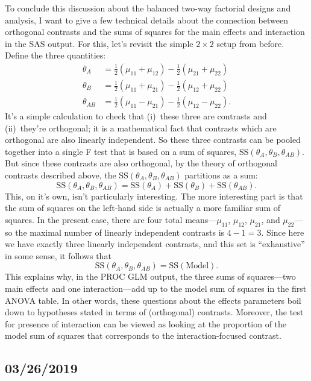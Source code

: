 \documentclass[a4paper, 12pt]{article}
\theoremstyle{plain}
\theoremstyle{definition}
\theoremstyle{remark}
\begin{document}
To conclude this discussion about the balanced two-way factorial designs and analysis, I want to give a few technical details about the connection between orthogonal contrasts and the sums of squares for the main effects and interaction in the SAS output.  For this, let's revisit the simple $2 \times 2$ setup from before.  Define the three quantities:
\begin{align*}
\theta_A & = \tfrac12(\mu_{11} + \mu_{12}) - \tfrac12(\mu_{21} + \mu_{22}) \\
\theta_B & = \tfrac12(\mu_{11} + \mu_{21}) - \tfrac12(\mu_{12} + \mu_{22}) \\
\theta_{AB} & = \tfrac12 (\mu_{11} - \mu_{21}) - \tfrac12 (\mu_{12} - \mu_{22}).
\end{align*}
It's a simple calculation to check that (i)~these three are contrasts and (ii)~they're orthogonal; it is a mathematical fact that contrasts which are orthogonal are also linearly independent.  So these three contrasts can be pooled together into a single F test that is based on a sum of squares, $\text{SS}(\theta_A, \theta_B, \theta_{AB})$.  But since these contrasts are also orthogonal, by the theory of orthogonal contrasts described above, the $\text{SS}(\theta_A, \theta_B, \theta_{AB})$ partitions as a sum:
\[ \text{SS}(\theta_A, \theta_B, \theta_{AB}) = \text{SS}(\theta_A) + \text{SS}(\theta_B) + \text{SS}(\theta_{AB}). \]
This, on it's own, isn't particularly interesting.  The more interesting part is that the sum of squares on the left-hand side is actually a more familiar sum of squares.  In the present case, there are four total means---$\mu_{11}$, $\mu_{12}$, $\mu_{21}$, and $\mu_{22}$---so the maximal number of linearly independent contrasts is $4-1=3$.  Since here we have exactly three linearly independent contrasts, and this set is ``exhaustive'' in some sense, it follows that 
\[ \text{SS}(\theta_A, \theta_B, \theta_{AB}) = \text{SS}(\text{Model}). \]
This explains why, in the PROC GLM output, the three sums of squares---two main effects and one interaction---add up to the model sum of squares in the first ANOVA table.  In other words, these questions about the effects parameters boil down to hypotheses stated in terms of (orthogonal) contrasts.  Moreover, the test for presence of interaction can be viewed as looking at the proportion of the model sum of squares that corresponds to the interaction-focused contrast.  

\subsection*{03/26/2019}
\end{document}
